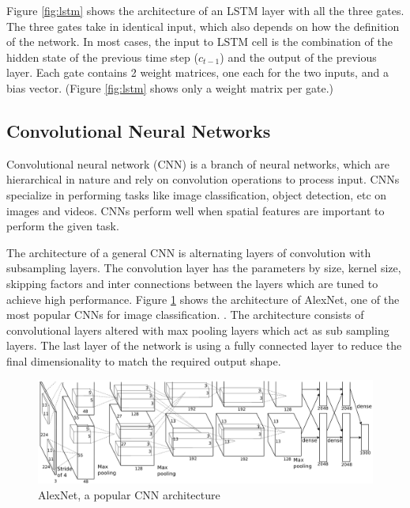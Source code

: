 Figure \ref{fig:lstm} shows the architecture of an LSTM layer with all the three gates. The three gates take in identical input, which also depends on how the definition of the network. In most cases, the input to LSTM cell is the combination of the hidden state of the previous time step ($c_{t-1}$) and the output of the previous layer. Each gate contains 2 weight matrices, one each for the two inputs, and a bias vector. (Figure \ref{fig:lstm} shows only a weight matrix per gate.) 


\subsection {Convolutional Neural Networks}
Convolutional neural network (CNN) is a branch of neural networks, which are hierarchical in nature and rely on convolution operations to process input. CNNs specialize in performing tasks like image classification, object detection, etc on images and videos. CNNs perform well when spatial features are important to perform the given task. \cite{KrizhevskyImageNetNetworks}

The architecture of a general CNN is alternating layers of convolution with subsampling layers. \cite{CiresanFlexibleClassification} The convolution layer has the parameters by size, kernel size, skipping factors and inter connections between the layers which are tuned to achieve high performance. Figure \ref{fig:cnn} shows the architecture of AlexNet, one of the most popular CNNs for image classification. \cite{KrizhevskyImageNetNetworks}. The architecture consists of convolutional layers altered with max pooling layers which act as sub sampling layers. The last layer of the network is using a fully connected layer to reduce the final dimensionality to match the required output shape.
\begin{figure}[ht]
  \begin{center}
    \includegraphics[width=\textwidth]{images/cnn.png} 
    \caption{AlexNet, a popular CNN architecture  \cite{KrizhevskyImageNetNetworks}}
    \label{fig:cnn}
  \end{center}
\end{figure}

